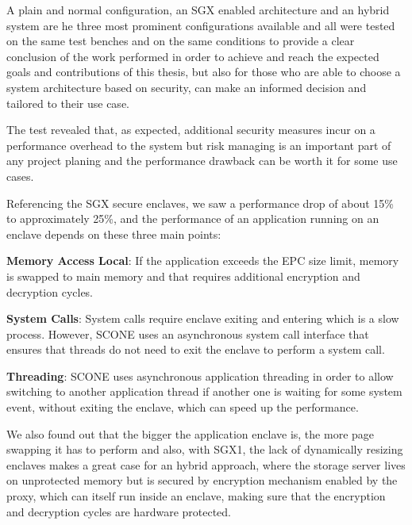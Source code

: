 A plain and normal configuration, an \gls{SGX} enabled architecture and an hybrid system are he three most prominent configurations available and all were tested on the same test benches and on the same conditions to provide a clear conclusion of the work performed in order to achieve and reach the expected goals and contributions of this thesis, but also for those who are able to choose a system architecture based on security, can make an informed decision and tailored to their use case.

The test revealed that, as expected, additional security measures incur on a performance overhead to the system but risk managing is an important part of any project planing and the performance drawback can be worth it for some use cases.

Referencing the \gls{SGX} secure enclaves, we saw a performance drop of about 15\% to approximately 25\%, and the performance of an application running on an enclave depends on these three main points:

\textbf{Memory Access Local}: If the application exceeds the \gls{EPC} size limit, memory is swapped to main memory and that requires additional encryption and decryption cycles.

\textbf{System Calls}: System calls require enclave exiting and entering which is a slow process. However, SCONE uses an asynchronous system call interface that ensures that threads do not need to exit the enclave to perform a system call.

\textbf{Threading}: SCONE uses asynchronous application threading in order to allow switching to another application thread if another one is waiting for some system event, without exiting the enclave, which can speed up the performance.

We also found out that the bigger the application enclave is, the more page swapping it has to perform and also, with \gls{SGX}1, the lack of dynamically resizing enclaves makes a great case for an hybrid approach, where the storage server lives on unprotected memory but is secured by encryption mechanism enabled by the proxy, which can itself run inside an enclave, making sure that the encryption and decryption cycles are hardware protected.

